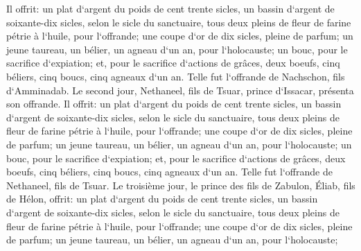 \verse Il offrit: un plat d`argent du poids de cent trente sicles, un bassin d`argent de soixante-dix sicles, selon le sicle du sanctuaire, tous deux pleins de fleur de farine pétrie à l`huile, pour l`offrande; 
\verse une coupe d`or de dix sicles, pleine de parfum; 
\verse un jeune taureau, un bélier, un agneau d`un an, pour l`holocauste; 
\verse un bouc, pour le sacrifice d`expiation; 
\verse et, pour le sacrifice d`actions de grâces, deux boeufs, cinq béliers, cinq boucs, cinq agneaux d`un an. Telle fut l`offrande de Nachschon, fils d`Amminadab. 
\verse Le second jour, Nethaneel, fils de Tsuar, prince d`Issacar, présenta son offrande. 
\verse Il offrit: un plat d`argent du poids de cent trente sicles, un bassin d`argent de soixante-dix sicles, selon le sicle du sanctuaire, tous deux pleins de fleur de farine pétrie à l`huile, pour l`offrande; 
\verse une coupe d`or de dix sicles, pleine de parfum; 
\verse un jeune taureau, un bélier, un agneau d`un an, pour l`holocauste; 
\verse un bouc, pour le sacrifice d`expiation; 
\verse et, pour le sacrifice d`actions de grâces, deux boeufs, cinq béliers, cinq boucs, cinq agneaux d`un an. Telle fut l`offrande de Nethaneel, fils de Tsuar. 
\verse Le troisième jour, le prince des fils de Zabulon, Éliab, fils de Hélon, 
\verse offrit: un plat d`argent du poids de cent trente sicles, un bassin d`argent de soixante-dix sicles, selon le sicle du sanctuaire, tous deux pleins de fleur de farine pétrie à l`huile, pour l`offrande; 
\verse une coupe d`or de dix sicles, pleine de parfum; 
\verse un jeune taureau, un bélier, un agneau d`un an, pour l`holocauste; 
